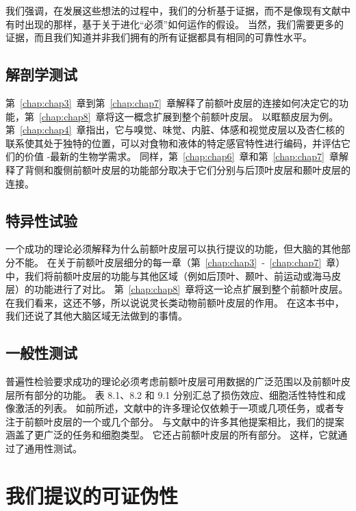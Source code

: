 我们强调，在发展这些想法的过程中，我们的分析基于证据，而不是像现有文献中有时出现的那样，基于关于进化“必须”如何运作的假设。
当然，我们需要更多的证据，而且我们知道并非我们拥有的所有证据都具有相同的可靠性水平。



\subsection{解剖学测试}

第~\ref{chap:chap3}~章到第~\ref{chap:chap7}~章解释了前额叶皮层的连接如何决定它的功能，第~\ref{chap:chap8}~章将这一概念扩展到整个前额叶皮层。
以眶额皮层为例。 第~\ref{chap:chap4}~章指出，它与嗅觉、味觉、内脏、体感和视觉皮层以及杏仁核的联系使其处于独特的位置，可以对食物和液体的特定感官特性进行编码，并评估它们的价值 -最新的生物学需求。
同样，第~\ref{chap:chap6}~章和第~\ref{chap:chap7}~章解释了背侧和腹侧前额叶皮层的功能部分取决于它们分别与后顶叶皮层和颞叶皮层的连接。



\subsection{特异性试验}

一个成功的理论必须解释为什么前额叶皮层可以执行提议的功能，但大脑的其他部分不能。
在关于前额叶皮层细分的每一章（第~\ref{chap:chap3}~-~\ref{chap:chap7}~章）中，我们将前额叶皮层的功能与其他区域（例如后顶叶、颞叶、前运动或海马皮层）的功能进行了对比。
第~\ref{chap:chap8}~章将这一论点扩展到整个前额叶皮层。
在我们看来，这还不够，所以说说灵长类动物前额叶皮层的作用。
在这本书中，我们还说了其他大脑区域无法做到的事情。



\subsection{一般性测试}

普遍性检验要求成功的理论必须考虑前额叶皮层可用数据的广泛范围以及前额叶皮层所有部分的功能。
表 8.1、8.2 和 9.1 分别汇总了损伤效应、细胞活性特性和成像激活的列表。
如前所述，文献中的许多理论仅依赖于一项或几项任务，或者专注于前额叶皮层的一个或几个部分。
与文献中的许多其他提案相比，我们的提案涵盖了更广泛的任务和细胞类型。
它还占前额叶皮层的所有部分。
这样，它就通过了通用性测试。



\section{我们提议的可证伪性}

